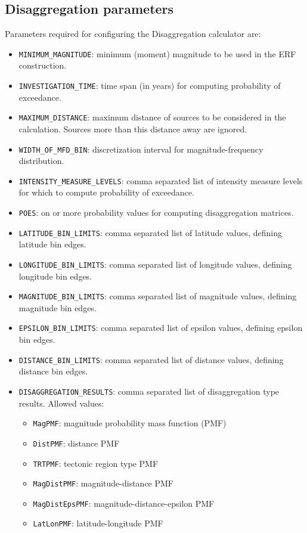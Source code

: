 \subsection{Disaggregation parameters}
Parameters required for configuring the Disaggregation calculator are:
\begin{itemize}
\item \Verb+MINIMUM_MAGNITUDE+: minimum (moment) magnitude to be used in the ERF construction.
\item \Verb+INVESTIGATION_TIME+: time span (in years) for computing probability of exceedance.
\item \Verb+MAXIMUM_DISTANCE+: maximum distance of sources to be considered in the calculation. Sources more than this distance away are ignored.
\item \Verb+WIDTH_OF_MFD_BIN+: discretization interval for  magnitude-frequency distribution.
\item \Verb+INTENSITY_MEASURE_LEVELS+: comma separated list of intensity measure levels for which to compute probability of exceedance.
\item \Verb+POES+: on or more probability values for computing disaggregation matrices.
\item \Verb+LATITUDE_BIN_LIMITS+: comma separated list of latitude values, defining latitude bin edges.
\item \Verb+LONGITUDE_BIN_LIMITS+: comma separated list of longitude values, defining longitude bin edges.
\item \Verb+MAGNITUDE_BIN_LIMITS+: comma separated list of magnitude values, defining magnitude bin edges.
\item \Verb+EPSILON_BIN_LIMITS+: comma separated list of epsilon values, defining epsilon bin edges.
\item \Verb+DISTANCE_BIN_LIMITS+: comma separated list of distance values, defining distance bin edges.
\item \Verb+DISAGGREGATION_RESULTS+: comma separated list of disaggregation type results. Allowed values:
\begin{itemize}
\item \Verb+MagPMF+: magnitude probability mass function (PMF)
\item \Verb+DistPMF+: distance PMF
\item \Verb+TRTPMF+: tectonic region type PMF
\item \Verb+MagDistPMF+: magnitude-distance PMF
\item \Verb+MagDistEpsPMF+: magnitude-distance-epsilon PMF
\item \Verb+LatLonPMF+: latitude-longitude PMF

\end{itemize}
\end{itemize}
